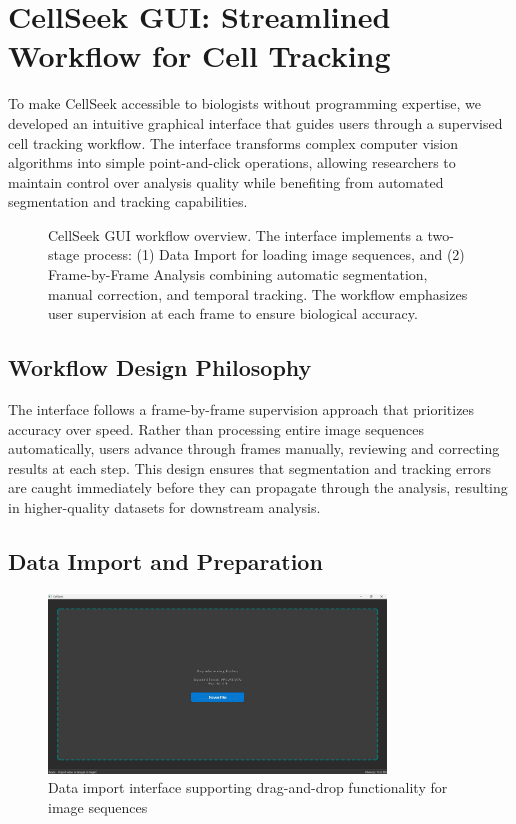 \documentclass[../cellseek_paper.tex]{subfiles}
\begin{document}
\section{CellSeek GUI: Streamlined Workflow for Cell Tracking}

To make CellSeek accessible to biologists without programming expertise, we developed an intuitive graphical interface that guides users through a supervised cell tracking workflow. The interface transforms complex computer vision algorithms into simple point-and-click operations, allowing researchers to maintain control over analysis quality while benefiting from automated segmentation and tracking capabilities.

\begin{figure}[H]
  \centering
  
  \caption{CellSeek GUI workflow overview. The interface implements a two-stage process: (1) Data Import for loading image sequences, and (2) Frame-by-Frame Analysis combining automatic segmentation, manual correction, and temporal tracking. The workflow emphasizes user supervision at each frame to ensure biological accuracy.}
  \label{fig:gui_workflow}
\end{figure}

\subsection{Workflow Design Philosophy}

The interface follows a frame-by-frame supervision approach that prioritizes accuracy over speed. Rather than processing entire image sequences automatically, users advance through frames manually, reviewing and correcting results at each step. This design ensures that segmentation and tracking errors are caught immediately before they can propagate through the analysis, resulting in higher-quality datasets for downstream analysis.

\subsection{Data Import and Preparation}

\begin{figure}[H]
  \centering
  \includegraphics[width=0.8\textwidth]{images/ui/import_images.jpg}
  \caption{Data import interface supporting drag-and-drop functionality for image sequences}
  \label{fig:import_images}
\end{figure}
\end{document}
